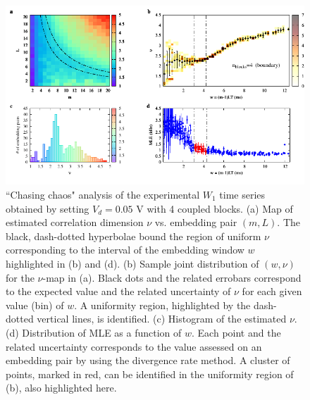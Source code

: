 \begin{figure}[H]
    \centering
    \includegraphics[width=\linewidth]{../blocks/4_blocks/2e5_points_new/plots/chaos_low.pdf}
    \caption{``Chasing chaos" analysis of the experimental $W_1$ time series obtained by setting $V_d=0.05$ V with 4 coupled blocks.
    (a) Map of estimated correlation dimension $\nu$ vs. embedding pair $(m, L)$.
    The black, dash-dotted hyperbolae bound the region of uniform $\nu$ corresponding to the interval of the
    embedding window $w$ highlighted in (b) and (d).
    (b) Sample joint distribution of $(w,\nu)$ for the $\nu$-map in (a).
    Black dots and the related errobars correspond to the expected value and the related uncertainty of $\nu$
    for each given value (bin) of $w$. A uniformity region, highlighted by the dash-dotted vertical lines,
    is identified. (c) Histogram of the estimated $\nu$. (d) Distribution of MLE as a function of $w$. Each point and the related
    uncertainty corresponds to the value assessed on an embedding pair by using the divergence rate method.
    A cluster of points, marked in red, can be identified in the uniformity region of (b), also highlighted here.}
    \label{fig:4 blocks chaos}
\end{figure}




